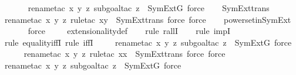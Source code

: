 \begin{isabellebody}
\ \ \ \ \ \isamarkupfalse%
{\isacharparenleft}{\kern0pt}rename{\isacharunderscore}{\kern0pt}tac\ x\ y\ z{\isacharcomma}{\kern0pt}\ subgoal{\isacharunderscore}{\kern0pt}tac\ {\isachardoublequoteopen}z\ {\isasymin}\ SymExt{\isacharparenleft}{\kern0pt}G{\isacharparenright}{\kern0pt}{\isachardoublequoteclose}{\isacharcomma}{\kern0pt}\ force{\isacharparenright}{\kern0pt}\isanewline
\ \ \isamarkupfalse%
\ SymExt{\isacharunderscore}{\kern0pt}trans\isanewline
\ \ \ \ \ \isamarkupfalse%
{\isacharparenleft}{\kern0pt}rename{\isacharunderscore}{\kern0pt}tac\ x\ y\ z{\isacharcomma}{\kern0pt}\ rule{\isacharunderscore}{\kern0pt}tac\ x{\isacharequal}{\kern0pt}y\ \ SymExt{\isacharunderscore}{\kern0pt}trans{\isacharcomma}{\kern0pt}\ force{\isacharcomma}{\kern0pt}\ force{\isacharparenright}{\kern0pt}\isanewline
\ \ \isamarkupfalse%
\ powerset{\isacharunderscore}{\kern0pt}in{\isacharunderscore}{\kern0pt}SymExt\ \isanewline
\ \ \ \ \isamarkupfalse%
\ force\ \isanewline
\ \ \isamarkupfalse%
\ extensionality{\isacharunderscore}{\kern0pt}def\isanewline
\ \ \ \isamarkupfalse%
{\isacharparenleft}{\kern0pt}rule\ rallI{\isacharparenright}{\kern0pt}{\isacharplus}{\kern0pt}\isanewline
\ \ \ \isamarkupfalse%
{\isacharparenleft}{\kern0pt}rule\ impI{\isacharparenright}{\kern0pt}\isanewline
\ \ \ \isamarkupfalse%
{\isacharparenleft}{\kern0pt}rule\ equality{\isacharunderscore}{\kern0pt}iffI{\isacharcomma}{\kern0pt}\ rule\ iffI{\isacharparenright}{\kern0pt}\isanewline
\ \ \ \ \isamarkupfalse%
{\isacharparenleft}{\kern0pt}rename{\isacharunderscore}{\kern0pt}tac\ x\ y\ z{\isacharcomma}{\kern0pt}\ subgoal{\isacharunderscore}{\kern0pt}tac\ {\isachardoublequoteopen}z\ {\isasymin}\ SymExt{\isacharparenleft}{\kern0pt}G{\isacharparenright}{\kern0pt}{\isachardoublequoteclose}{\isacharcomma}{\kern0pt}\ force{\isacharparenright}{\kern0pt}\isanewline
\ \ \ \ \isamarkupfalse%
{\isacharparenleft}{\kern0pt}rename{\isacharunderscore}{\kern0pt}tac\ x\ y\ z{\isacharcomma}{\kern0pt}\ rule{\isacharunderscore}{\kern0pt}tac\ x{\isacharequal}{\kern0pt}x\ \ SymExt{\isacharunderscore}{\kern0pt}trans{\isacharcomma}{\kern0pt}\ force{\isacharcomma}{\kern0pt}\ force{\isacharparenright}{\kern0pt}\isanewline
\ \ \ \ \isamarkupfalse%
{\isacharparenleft}{\kern0pt}rename{\isacharunderscore}{\kern0pt}tac\ x\ y\ z{\isacharcomma}{\kern0pt}\ subgoal{\isacharunderscore}{\kern0pt}tac\ {\isachardoublequoteopen}z\ {\isasymin}\ SymExt{\isacharparenleft}{\kern0pt}G{\isacharparenright}{\kern0pt}{\isachardoublequoteclose}{\isacharcomma}{\kern0pt}\ force{\isacharparenright}{\kern0pt}\isanewline

\end{isabellebody}
